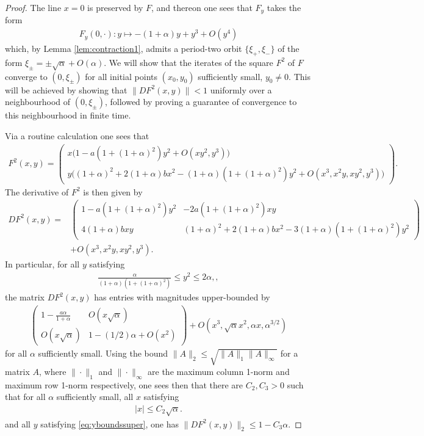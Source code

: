 \documentclass{article}
\theoremstyle{plain}
\theoremstyle{definition}
\theoremstyle{remark}
\begin{document}
\begin{proof}
    The line $x = 0$ is preserved by $F$, and thereon one sees that $F_y$ takes the form
    \begin{align}
        F_y(0,\cdot):y\mapsto -(1+\alpha)y+y^3+O(y^4)
    \end{align}
    which, by Lemma \ref{lem:contraction1}, admits a period-two orbit $\{\xi_+,\xi_-\}$ of the form $\xi_{\pm} = \pm\sqrt{\alpha}+O(\alpha)$. We will show that the iterates of the square $F^2$ of $F$ converge to $(0,\xi_{\pm})$ for all initial points $(x_0,y_0)$ sufficiently small, $y_0\neq0$. This will be achieved by showing that $\|DF^2(x,y)\|<1$ uniformly over a neighbourhood of $(0,\xi_{\pm})$, followed by proving a guarantee of convergence to this neighbourhood in finite time.
    
    Via a routine calculation one sees that
    \begin{align}
        F^2(x,y) =\begin{pmatrix} x\big(1-a(1+(1+\alpha)^2)y^2 + O(xy^2,y^3)\big)\\ y\big((1+\alpha)^2+2(1+\alpha)bx^2-(1+\alpha)(1+(1+\alpha)^2)y^2+O(x^3,x^2y,xy^2,y^3)\big)\end{pmatrix}.
    \end{align}
    The derivative of $F^2$ is then given by
    \begin{align}
        DF^2(x,y) =& \begin{pmatrix} 1-a(1+(1+\alpha)^2)y^2 & -2a(1+(1+\alpha)^2)xy \\ 4(1+\alpha)bxy & (1+\alpha)^2 + 2(1+\alpha)bx^2-3(1+\alpha)(1+(1+\alpha)^2)y^2\end{pmatrix}\\& + O(x^3,x^2y,xy^2,y^3).
    \end{align}
    In particular, for all $y$ satisfying
    \begin{align}
        \frac{\alpha}{(1+\alpha)(1+(1+\alpha)^2)}\leq y^2\leq 2\alpha,\label{eq:yboundssuper},
    \end{align}
    the matrix $DF^2(x,y)$ has entries with magnitudes upper-bounded by
    \begin{align}
        \begin{pmatrix}
            1-\frac{a\alpha}{1+\alpha}  & O(x\sqrt{\alpha}) \\ O(x\sqrt{\alpha}) & 1-(1/2)\alpha + O(x^2)
        \end{pmatrix} + O(x^3,\sqrt{\alpha}x^2,\alpha x,\alpha^{3/2})
    \end{align}
    for all $\alpha$ sufficiently small. Using the bound $\|A\|_2\leq \sqrt{\|A\|_1\|A\|_{\infty}}$ for a matrix $A$, where $\|\cdot\|_1$ and $\|\cdot\|_{\infty}$ are the maximum column 1-norm and maximum row 1-norm respectively, one sees then that there are $C_2,C_3>0$ such that for all $\alpha$ sufficiently small, all $x$ satisfying
    \begin{align}
        |x|\leq C_2\sqrt{\alpha}.\label{eq:xboundssuper}
    \end{align}
    and all $y$ satisfying \eqref{eq:yboundssuper}, one has $\|DF^2(x,y)\|_2\leq 1-C_3\alpha$.
    

\end{proof}
\end{document}
